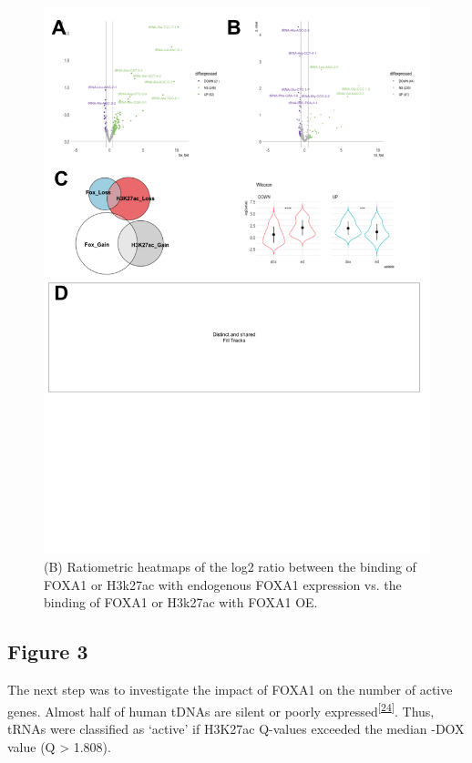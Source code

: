 \documentclass[
  12pt,
]{article}
\begin{document}
\begin{figure}[H]

{\centering \includegraphics[width=1\linewidth]{../images/results-02} 

}

\caption{(B) Ratiometric heatmaps of the log2 ratio between the binding of FOXA1 or H3k27ac with endogenous FOXA1 expression vs. the binding of FOXA1 or H3k27ac with FOXA1 OE.}\label{fig:results-2}
\end{figure}

\hypertarget{figure-3}{%
\subsection{Figure 3}\label{figure-3}}

The next step was to investigate the impact of FOXA1 on the number of active genes.
Almost half of human tDNAs are silent or poorly expressed\textsuperscript{{[}\protect\hyperlink{ref-Torres2019}{24}{]}}.
Thus, tRNAs were classified as `active' if H3K27ac Q-values exceeded the median -DOX value (Q \textgreater{} 1.808).
\end{document}
